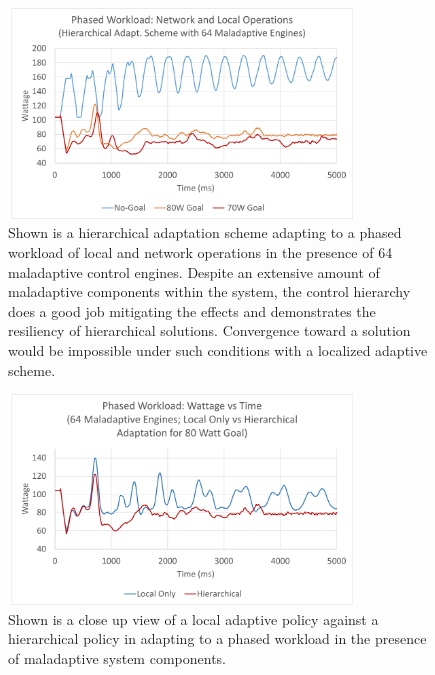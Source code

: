             \begin{figure}[htb!]
                \centering
                \includegraphics[width=0.82\textwidth]{Fig/phase_hier_maladaptive.pdf}
                \caption[Phased Workload Using an Adaptive Goal Adjustment Policy with Maladaptive System Components (Watts vs Time)]{Shown is a hierarchical adaptation scheme adapting to a phased workload of local and network operations in the presence of 64 maladaptive control engines. Despite an extensive amount of maladaptive components within the system, the control hierarchy does a good job mitigating the effects and demonstrates the resiliency of hierarchical solutions. Convergence toward a solution would be impossible under such conditions with a localized adaptive scheme.}
                \label{fig:phase_hier_maladaptive}
            \end{figure}

            \begin{figure}[htb!]
                \centering
                \includegraphics[width=0.82\textwidth]{Fig/phase_zoom_maladaptive.pdf}
                \caption[Phased Workload Local Only vs Hierarchal Adaptation with Maladaptive System Components (Watts vs Time)]{Shown is a close up view of a local adaptive policy against a hierarchical policy in adapting to a phased workload in the presence of maladaptive system components.}
                \label{fig:phase_zoom_maladaptive}
            \end{figure}

